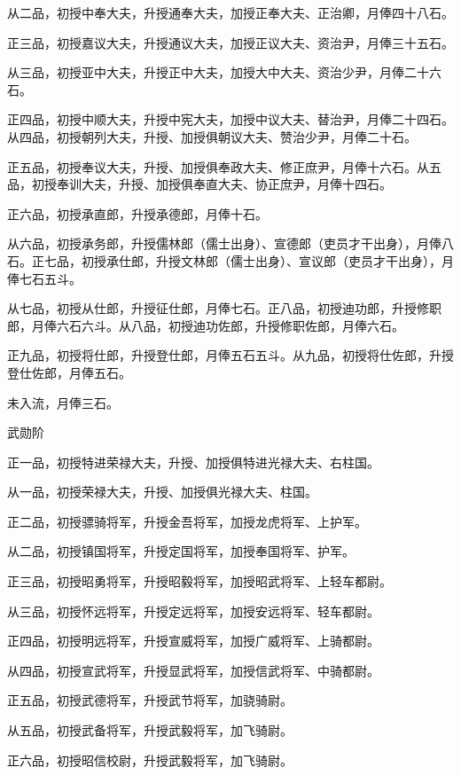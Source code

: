 \documentclass[a4paper,12pt,UTF8,twoside]{ctexbook}
\begin{document}
    从二品，初授中奉大夫，升授通奉大夫，加授正奉大夫、正治卿，月俸四十八石。
    
    正三品，初授嘉议大夫，升授通议大夫，加授正议大夫、资治尹，月俸三十五石。
    
    从三品，初授亚中大夫，升授正中大夫，加授大中大夫、资治少尹，月俸二十六石。
    
    正四品，初授中顺大夫，升授中宪大夫，加授中议大夫、替治尹，月俸二十四石。从四品，初授朝列大夫，升授、加授俱朝议大夫、赞治少尹，月俸二十石。
    
    正五品，初授奉议大夫，升授、加授俱奉政大夫、修正庶尹，月俸十六石。从五品，初授奉训大夫，升授、加授俱奉直大夫、协正庶尹，月俸十四石。
    
    正六品，初授承直郎，升授承德郎，月俸十石。
    
    从六品，初授承务郎，升授儒林郎（儒士出身）、宣德郎（吏员才干出身），月俸八石。正七品，初授承仕郎，升授文林郎（儒士出身）、宣议郎（吏员才干出身），月俸七石五斗。
    
    从七品，初授从仕郎，升授征仕郎，月俸七石。正八品，初授迪功郎，升授修职郎，月俸六石六斗。从八品，初授迪功佐郎，升授修职佐郎，月俸六石。
    
    正九品，初授将仕郎，升授登仕郎，月俸五石五斗。从九品，初授将仕佐郎，升授登仕佐郎，月俸五石。
    
    未入流，月俸三石。
    
    武勋阶
    
    正一品，初授特进荣禄大夫，升授、加授俱特进光禄大夫、右柱国。
    
    从一品，初授荣禄大夫，升授、加授俱光禄大夫、柱国。
    
    正二品，初授骠骑将军，升授金吾将军，加授龙虎将军、上护军。
    
    从二品，初授镇国将军，升授定国将军，加授奉国将军、护军。
    
    正三品，初授昭勇将军，升授昭毅将军，加授昭武将军、上轻车都尉。
    
    从三品，初授怀远将军，升授定远将军，加授安远将军、轻车都尉。
    
    正四品，初授明远将军，升授宣威将军，加授广威将军、上骑都尉。
    
    从四品，初授宣武将军，升授显武将军，加授信武将军、中骑都尉。
    
    正五品，初授武德将军，升授武节将军，加骁骑尉。
    
    从五品，初授武备将军，升授武毅将军，加飞骑尉。
    
    正六品，初授昭信校尉，升授武毅将军，加飞骑尉。
    
\end{document}
